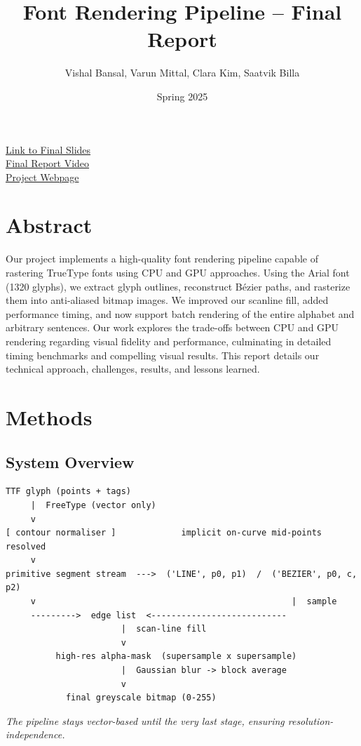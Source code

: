 \documentclass[11pt]{article}
\title{Font Rendering Pipeline -- Final Report}
\author{Vishal Bansal, Varun Mittal, Clara Kim, Saatvik Billa}
\date{Spring 2025}
\begin{document}
\doublespacing
\maketitle

\href{https://docs.google.com/presentation/d/1kbRLRtB4DUGVzhKq4TOdJPcwAlWVAb9mF2iKYlNwYdU/edit?usp=sharing}{Link to Final Slides}\\

\href{https://drive.google.com/file/d/18JlJTOpAL61NVxUDC-0UwzD6y9mtmdAb/view?usp=sharing}{Final Report Video}\\

\href{https://vbansal-29.github.io/cs184_final/}{Project Webpage}

\tableofcontents
\newpage

\section{Abstract}

Our project implements a high-quality font rendering pipeline capable of rastering TrueType fonts using CPU and GPU approaches. Using the Arial font (1320 glyphs), we extract glyph outlines, reconstruct Bézier paths, and rasterize them into anti-aliased bitmap images. We improved our scanline fill, added performance timing, and now support batch rendering of the entire alphabet and arbitrary sentences. Our work explores the trade-offs between CPU and GPU rendering regarding visual fidelity and performance, culminating in detailed timing benchmarks and compelling visual results. This report details our technical approach, challenges, results, and lessons learned. \par


\newpage
\section{Methods}

\subsection{System Overview}
\begin{verbatim}
TTF glyph (points + tags)
     |  FreeType (vector only)
     v
[ contour normaliser ]             implicit on-curve mid-points resolved
     v
primitive segment stream  --->  ('LINE', p0, p1)  /  ('BEZIER', p0, c, p2)
     v                                                   |  sample
     --------->  edge list  <---------------------------
                       |  scan-line fill
                       v
          high-res alpha-mask  (supersample x supersample)
                       |  Gaussian blur -> block average
                       v
            final greyscale bitmap (0-255)
\end{verbatim}
\textit{The pipeline stays vector-based until the very last stage, ensuring resolution-independence.} \par
\end{document}
